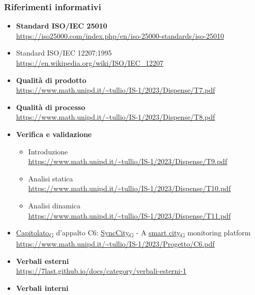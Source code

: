 \subsubsection{Riferimenti informativi}
\begin{itemize}
    \item \textbf{Standard ISO/IEC 25010} \\
        \url{https://iso25000.com/index.php/en/iso-25000-standards/iso-25010}
    \item Standard ISO/IEC 12207:1995 \\
        \url{https://en.wikipedia.org/wiki/ISO/IEC_12207}
    \item \textbf{Qualità di prodotto} \\
        \url{https://www.math.unipd.it/~tullio/IS-1/2023/Dispense/T7.pdf}
    \item \textbf{Qualità di processo} \\
        \url{https://www.math.unipd.it/~tullio/IS-1/2023/Dispense/T8.pdf}
    \item \textbf{Verifica e validazione}
        \begin{itemize}
            \item Introduzione \\
                \url{https://www.math.unipd.it/~tullio/IS-1/2023/Dispense/T9.pdf}
            \item Analisi statica \\
                \url{https://www.math.unipd.it/~tullio/IS-1/2023/Dispense/T10.pdf}
            \item Analisi dinamica \\
                \url{https://www.math.unipd.it/~tullio/IS-1/2023/Dispense/T11.pdf}
        \end{itemize}
    \item \href{https://7last.github.io/docs/rtb/documentazione-interna/glossario\#capitolato}{Capitolato\textsubscript{G}} d'appalto C6: \href{https://7last.github.io/docs/rtb/documentazione-interna/glossario\#synccity}{SyncCity\textsubscript{G}} - A \href{https://7last.github.io/docs/rtb/documentazione-interna/glossario\#smart-city}{smart city\textsubscript{G}} monitoring platform\\
        \url{https://www.math.unipd.it/~tullio/IS-1/2023/Progetto/C6.pdf}
    \item \textbf{Verbali esterni} \\
        \url{https://7last.github.io/docs/category/verbali-esterni-1}
    \item \textbf{Verbali interni} \\

\end{itemize}
